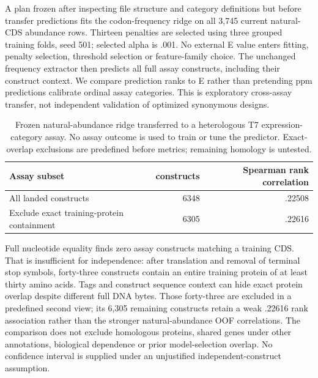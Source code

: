 A plan frozen after inspecting file structure and category definitions but before transfer predictions fits the codon-frequency ridge on all 3,745 current natural-CDS abundance rows. Thirteen penalties are selected using three grouped training folds, seed 501; selected alpha is .001. No external E value enters fitting, penalty selection, threshold selection or feature-family choice. The unchanged frequency extractor then predicts all full assay constructs, including their construct context. We compare prediction ranks to E rather than pretending ppm predictions calibrate ordinal assay categories. This is exploratory cross-assay transfer, not independent validation of optimized synonymous designs.
\begin{table}[ht]\centering
\caption{Frozen natural-abundance ridge transferred to a heterologous T7 expression-category assay. No assay outcome is used to train or tune the predictor. Exact-overlap exclusions are predefined before metrics; remaining homology is untested.}
\begin{tabular}{lrr}\hline
Assay subset & constructs & Spearman rank correlation\\\hline
All landed constructs &6348&.22508\\
Exclude exact training-protein containment &6305&.22616\\\hline
\end{tabular}\end{table}

Full nucleotide equality finds zero assay constructs matching a training CDS. That is insufficient for independence: after translation and removal of terminal stop symbols, forty-three constructs contain an entire training protein of at least thirty amino acids. Tags and construct sequence context can hide exact protein overlap despite different full DNA bytes. Those forty-three are excluded in a predefined second view; its 6,305 remaining constructs retain a weak .22616 rank association rather than the stronger natural-abundance OOF correlations. The comparison does not exclude homologous proteins, shared genes under other annotations, biological dependence or prior model-selection overlap. No confidence interval is supplied under an unjustified independent-construct assumption.

